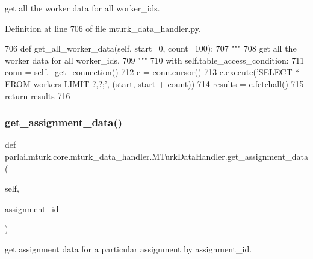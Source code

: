 \begin{DoxyVerb}get all the worker data for all worker_ids.
\end{DoxyVerb}
 

Definition at line 706 of file mturk\+\_\+data\+\_\+handler.\+py.


\begin{DoxyCode}
706     \textcolor{keyword}{def }get\_all\_worker\_data(self, start=0, count=100):
707         \textcolor{stringliteral}{"""}
708 \textcolor{stringliteral}{        get all the worker data for all worker\_ids.}
709 \textcolor{stringliteral}{        """}
710         with self.table\_access\_condition:
711             conn = self.\_get\_connection()
712             c = conn.cursor()
713             c.execute(\textcolor{stringliteral}{'SELECT * FROM workers LIMIT ?,?;'}, (start, start + count))
714             results = c.fetchall()
715             \textcolor{keywordflow}{return} results
716 
\end{DoxyCode}
\mbox{\label{classparlai_1_1mturk_1_1core_1_1mturk__data__handler_1_1MTurkDataHandler_ab41299fc55cf09e4d0921aac63889a86}} 
\subsubsection{\texorpdfstring{get\+\_\+assignment\+\_\+data()}{get\_assignment\_data()}}
{\footnotesize\ttfamily def parlai.\+mturk.\+core.\+mturk\+\_\+data\+\_\+handler.\+M\+Turk\+Data\+Handler.\+get\+\_\+assignment\+\_\+data (\begin{DoxyParamCaption}\item[{}]{self,  }\item[{}]{assignment\+\_\+id }\end{DoxyParamCaption})}

\begin{DoxyVerb}get assignment data for a particular assignment by assignment_id.
\end{DoxyVerb}
 


